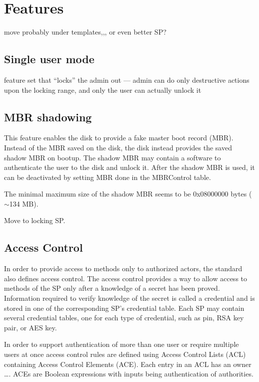 \section{Features}

move probably under templates,,, or even better SP?

\subsection{Single user mode}

feature set that ``locks'' the admin out --- admin can do only destructive actions upon the locking range, and only the user can actually unlock it

\subsection{MBR shadowing}

This feature enables the disk to provide a fake master boot record (MBR). Instead of the MBR saved on the disk, the disk instead provides the saved shadow MBR on bootup. The shadow MBR may contain a software to authenticate the user to the disk and unlock it. After the shadow MBR is used, it can be deactivated by setting MBR done in the MBRControl table.

The minimal maximum size of the shadow MBR seems to be 0x08000000 bytes ($\sim$134 MB).

Move to locking SP.



\subsection{Access Control}

In order to provide access to methods only to authorized actors, the standard also defines access control. The access control provides a way to allow access to methods of the SP only after a knowledge of a secret has been proved. Information required to verify knowledge of the secret is called a credential and is stored in one of the corresponding SP's credential table. Each SP may contain several credential tables, one for each type of credential, such as pin, RSA key pair, or AES key.

In order to support authentication of more than one user or require multiple users at once access control rules are defined using Access Control Lists (ACL) containing Access Control Elements (ACE). Each entry in an ACL has an owner \dots. ACEs are Boolean expressions with inputs being authentication of authorities.


